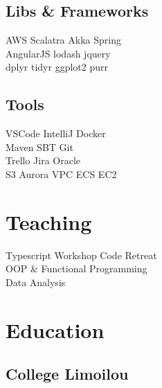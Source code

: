 \documentclass[letterpaper]{deedy-resume} %
\begin{document}
\begin{minipage}[t]{0.33\textwidth}
\sectionspace %

\subsection{Libs \& Frameworks}

AWS \textbullet{} Scalatra \textbullet{} Akka \textbullet{} Spring \\
AngularJS \textbullet{} lodash \textbullet{} jquery \\
dplyr \textbullet{} tidyr \textbullet{} ggplot2 \textbullet{} purr

\sectionspace %

\subsection{Tools}

VSCode \textbullet{} IntelliJ \textbullet{} Docker \\
Maven \textbullet{} SBT \textbullet{} Git \\
Trello \textbullet{} Jira \textbullet{} Oracle \\
S3 \textbullet{} Aurora \textbullet{} VPC \textbullet{} ECS \textbullet{} EC2

\sectionspace %


\section{Teaching}

Typescript Workshop \textbullet{} Code Retreat \\
OOP \& Functional Programming \\
Data Analysis

\sectionspace %


\section{Education} 

\subsection{College Limoilou}


\end{minipage}
\end{document}
